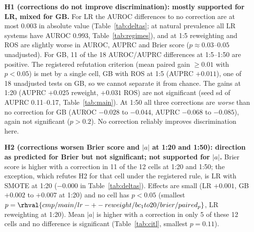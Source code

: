 \begin{table}[t]\centering\caption{Primary regime, 1:20 (12 training positives), 10 seeds. AUROC, AUPRC, Brier score and $|a|$ (absolute calibration-in-the-large): mean $\pm$ sd; calibration slope $b$ and $|b-1|$: median [IQR]. Threshold moving has the probabilities of no correction and is omitted.}\label{tab:main}
\small
\end{table}

\begin{table}[t]\centering\caption{AUROC, AUPRC and Brier score across prevalences (nat.\ = natural), mean of 10 seeds; threshold moving equals no correction here.}\label{tab:regimes}
\small
\end{table}

\begin{table}[t]\centering\caption{Paired difference to no correction, same learner (positive $\Delta$Brier = worse). $^{*}$: unadjusted paired $p<0.05$, 10 seeds.}\label{tab:deltas}
\small
\end{table}

\textbf{H1 (corrections do not improve discrimination): mostly supported for LR, mixed for GB.} For LR the AUROC differences to no correction are at most 0.003 in absolute value (Table~\ref{tab:deltas}; at natural prevalence all LR systems have AUROC 0.993, Table~\ref{tab:regimes}), and at 1:5 reweighting and ROS are slightly worse in AUROC, AUPRC and Brier score ($p\approx0.03$--$0.05$ unadjusted). For GB, 11 of the 18 AUROC/AUPRC differences at 1:5--1:50 are positive. The registered refutation criterion (mean paired gain $\ge 0.01$ with $p<0.05$) is met by a single cell, GB with ROS at 1:5 (AUPRC $+0.011$), one of 18 unadjusted tests on GB, so we cannot separate it from chance. The gains at 1:20 (AUPRC $+0.025$ reweight, $+0.031$ ROS) are not significant (seed sd of AUPRC 0.11--0.17, Table~\ref{tab:main}). At 1:50 all three corrections are \emph{worse} than no correction for GB (AUROC $-0.028$ to $-0.044$, AUPRC $-0.068$ to $-0.085$), again not significant ($p>0.2$). No correction reliably improves discrimination here.

\textbf{H2 (corrections worsen Brier score and $|a|$ at 1:20 and 1:50): direction as predicted for Brier but not significant; not supported for $|a|$.} Brier score is higher with a correction in 11 of the 12 cells at 1:20 and 1:50; the exception, which refutes H2 for that cell under the registered rule, is LR with SMOTE at 1:20 ($-0.000$ in Table~\ref{tab:deltas}). Effects are small (LR $+0.001$, GB $+0.002$ to $+0.007$ at 1:20) and no cell has $p<0.05$ (smallest $p=\rhval{cmp/main/lr-+-reweight/bc_1to20/brier/paired_p}$, LR reweighting at 1:20). Mean $|a|$ is higher with a correction in only 5 of these 12 cells and no difference is significant (Table~\ref{tab:citl}, smallest $p=0.11$).

